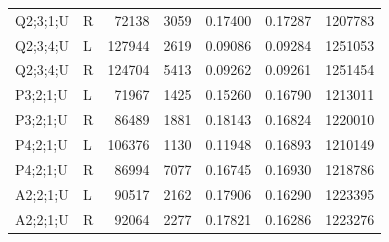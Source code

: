 {\begin{longtable}{@{}llrrrrr@{}}
Q2;3;1;U & R & 72138 & 3059 & 0.17400 & 0.17287 & 1207783 \\
Q2;3;4;U & L & 127944 & 2619 & 0.09086 & 0.09284 & 1251053 \\
Q2;3;4;U & R & 124704 & 5413 & 0.09262 & 0.09261 & 1251454 \\
P3;2;1;U & L & 71967 & 1425 & 0.15260 & 0.16790 & 1213011 \\
P3;2;1;U & R & 86489 & 1881 & 0.18143 & 0.16824 & 1220010 \\
P4;2;1;U & L & 106376 & 1130 & 0.11948 & 0.16893 & 1210149 \\
P4;2;1;U & R & 86994 & 7077 & 0.16745 & 0.16930 & 1218786 \\
A2;2;1;U & L & 90517 & 2162 & 0.17906 & 0.16290 & 1223395 \\
A2;2;1;U & R & 92064 & 2277 & 0.17821 & 0.16286 & 1223276 \\
\end{longtable}
}
